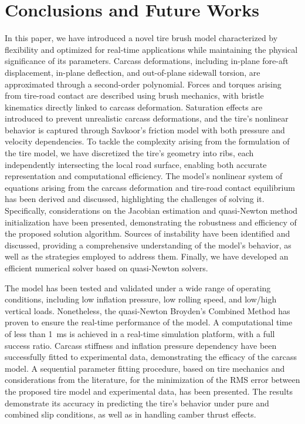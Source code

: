 
\section{Conclusions and Future Works}

In this paper, we have introduced a novel tire brush model characterized by flexibility and optimized for real-time applications while maintaining the physical significance of its parameters. Carcass deformations, including in-plane fore-aft displacement, in-plane deflection, and out-of-plane sidewall torsion, are approximated through a second-order polynomial. Forces and torques arising from tire-road contact are described using brush mechanics, with bristle kinematics directly linked to carcass deformation. Saturation effects are introduced to prevent unrealistic carcass deformations, and the tire's nonlinear behavior is captured through Savkoor's friction model with both pressure and velocity dependencies. To tackle the complexity arising from the formulation of the tire model, we have discretized the tire's geometry into ribs, each independently intersecting the local road surface, enabling both accurate representation and computational efficiency. The model's nonlinear system of equations arising from the carcass deformation and tire-road contact equilibrium has been derived and discussed, highlighting the challenges of solving it. Specifically, considerations on the Jacobian estimation and quasi-Newton method initialization have been presented, demonstrating the robustness and efficiency of the proposed solution algorithm. Sources of instability have been identified and discussed, providing a comprehensive understanding of the model's behavior, as well as the strategies employed to address them. Finally, we have developed an efficient numerical solver based on quasi-Newton solvers.

The model has been tested and validated under a wide range of operating conditions, including low inflation pressure, low rolling speed, and low/high vertical loads. Nonetheless, the quasi-Newton Broyden's Combined Method has proven to ensure the real-time performance of the model. A computational time of less than \SI{1}{\milli\second} is achieved in a real-time simulation platform, with a full success ratio. Carcass stiffness and inflation pressure dependency have been successfully fitted to experimental data, demonstrating the efficacy of the carcass model. A sequential parameter fitting procedure, based on tire mechanics and considerations from the literature, for the minimization of the \ac{RMS} error between the proposed tire model and experimental data, has been presented. The results demonstrate its accuracy in predicting the tire's behavior under pure and combined slip conditions, as well as in handling camber thrust effects.

